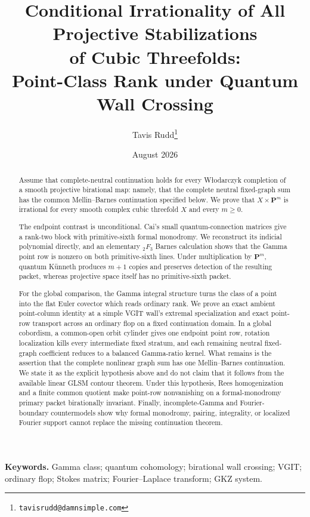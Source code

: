 \documentclass[11pt]{article}
\title{Conditional Irrationality of All Projective Stabilizations\\
  of Cubic Threefolds:\\
  Point-Class Rank under Quantum Wall Crossing}
\author{Tavis Rudd\thanks{\texttt{tavisrudd@damnsimple.com}}}
\date{August 2026}
\theoremstyle{definition}
\theoremstyle{remark}
\begin{document}
\maketitle

\begin{abstract}
Assume that complete-neutral continuation holds for every W{\l}odarczyk
completion of a smooth projective birational map: namely, that the complete
neutral fixed-graph sum has the common Mellin--Barnes continuation specified
below.  We prove that \(X\times\mathbf P^m\) is irrational for every smooth
complex cubic threefold \(X\) and every \(m\geq0\).

The endpoint contrast is unconditional.  Cai's small quantum-connection
matrices give a rank-two block with primitive-sixth formal monodromy.  We
reconstruct its indicial polynomial directly, and an elementary
\({}_2F_3\) Barnes calculation shows that the Gamma point row is nonzero on
both primitive-sixth lines.  Under multiplication by \(\mathbf P^m\), quantum
K\"unneth produces \(m+1\) copies and preserves detection of the resulting
packet, whereas projective space itself has no primitive-sixth packet.

For the global comparison, the Gamma integral structure turns the class of a
point into the flat Euler covector which reads ordinary rank.  We prove an
exact ambient point-column identity at a simple VGIT wall's extremal
specialization and exact point-row transport across an ordinary flop on a
fixed continuation domain.  In a global cobordism, a common-open orbit
cylinder gives one endpoint point row, rotation localization kills every
intermediate fixed stratum, and each remaining neutral fixed-graph
coefficient reduces to a balanced Gamma-ratio kernel.  What remains is the
assertion that the complete nonlinear graph sum has one Mellin--Barnes
continuation.  We state it as the
explicit hypothesis above and do not claim that it follows from the available
linear GLSM contour theorem.  Under this hypothesis, Rees homogenization and
a finite common quotient make point-row nonvanishing on a formal-monodromy
primary packet birationally invariant.  Finally, incomplete-Gamma and
Fourier-boundary countermodels show why formal monodromy, pairing,
integrality, or localized Fourier support cannot replace the missing
continuation theorem.
\end{abstract}

\noindent\textbf{Keywords.} Gamma class; quantum cohomology; birational wall
crossing; VGIT; ordinary flop; Stokes matrix; Fourier--Laplace transform;
GKZ system.
\end{document}
